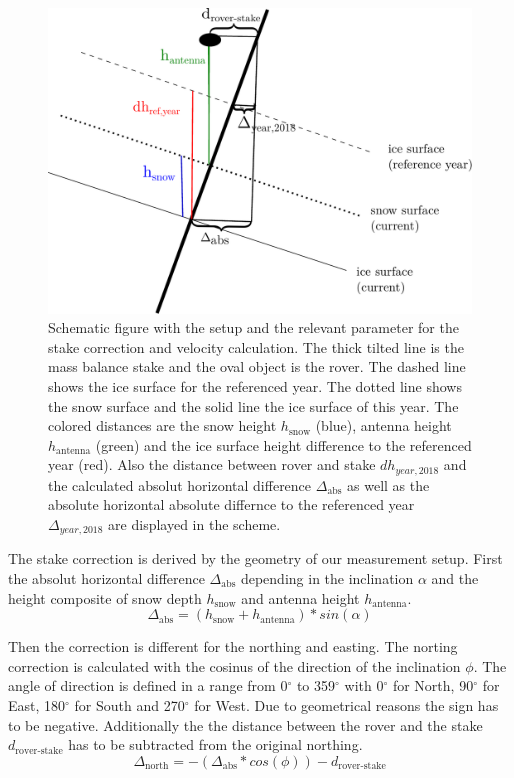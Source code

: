 \begin{figure}[H]
	\centering
	\includegraphics[width=0.9\linewidth]{./figs/pictures/schematic_setup.pdf}
	\caption{Schematic figure with the setup and the relevant parameter for the stake correction and velocity calculation. The thick tilted line is the mass balance stake and the oval object is the rover. The dashed line shows the ice surface for the referenced year. The dotted line shows the snow surface and the solid line the ice surface of this year. The colored distances are the snow height $h_{\text{snow}}$ (blue), antenna height $h_{\text{antenna}}$ (green) and the ice surface height difference to the referenced year (red). Also the distance between rover and stake $dh_{year,2018}$ and the calculated absolut horizontal difference $\Delta_{\text{abs}}$ as well as the absolute horizontal absolute differnce to the referenced year $\Delta_{year,2018}$ are displayed in the scheme.}
	\label{GPS:fig:scheme}
\end{figure}

The stake correction is derived by the geometry of our measurement setup.
First the absolut horizontal difference $\Delta_{\text{abs}}$ depending in the inclination $\alpha$ and the height composite of snow depth $h_{\text{snow}}$ and antenna height $h_{\text{antenna}}$.
\begin{equation}
	\Delta_{\text{abs}} = (h_{\text{snow}} + h_{\text{antenna}}) * sin(\alpha)
\end{equation}

Then the correction is different for the northing and easting. The norting correction is calculated with the cosinus of the direction of the inclination $\phi$. 
The angle of direction is defined in a range from 0$^{\circ}$ to 359$^{\circ}$ with 0$^{\circ}$ for North, 90$^{\circ}$ for East, 180$^{\circ}$ for South and 270$^{\circ}$ for West.
Due to geometrical reasons the sign has to be negative. 
Additionally the the distance between the rover and the stake $d_{\text{rover-stake}}$ has to be subtracted from the original northing.
\begin{equation}
	\Delta_{\text{north}} = - (\Delta_{\text{abs}} * cos(\phi)) - d_{\text{rover-stake}}
\end{equation}


